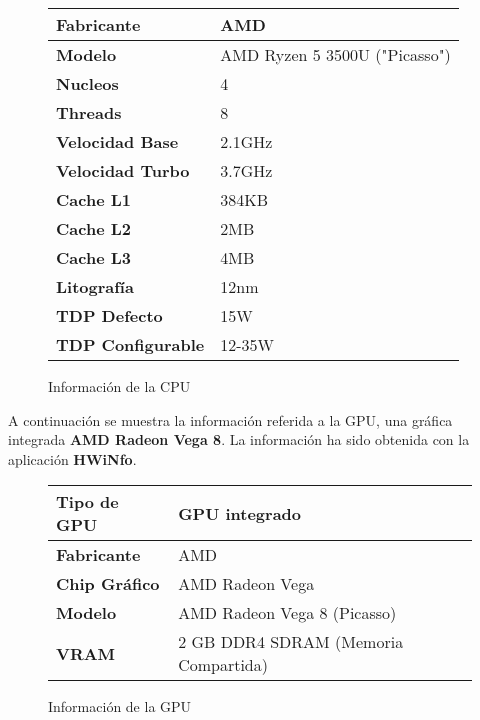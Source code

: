 \begin{figure}[ht]
    \centering

    \setlength{\tabcolsep}{10pt}
    \renewcommand{\arraystretch}{1.5}

    \begin{tabular}{| p{10em} | p{15em} |}
        \hline
        \textbf{Fabricante}       &  AMD \\ \hline
        \textbf{Modelo}           &  AMD Ryzen 5 3500U ("Picasso") \\ \hline
        \textbf{Nucleos}          &  4 \\ \hline
        \textbf{Threads}          & 8 \\ \hline
        \textbf{Velocidad Base}   &  2.1GHz \\  \hline
        \textbf{Velocidad Turbo}  &  3.7GHz  \\ \hline
        \textbf{Cache L1}  		  & 384KB  \\ \hline
        \textbf{Cache L2} 	      & 2MB  \\ \hline
        \textbf{Cache L3}  	      & 4MB  \\ \hline
        \textbf{Litografía}	      & 12nm   \\  \hline
        \textbf{TDP Defecto}      & 15W \\ \hline
        \textbf{TDP Configurable} & 12-35W \\
        \hline
    \end{tabular}
    \caption{Información de la CPU}
\end{figure}

A continuación se muestra la información referida a la GPU, una gráfica integrada \textbf{AMD Radeon Vega 8}. La información ha sido obtenida con la aplicación \textbf{HWiNfo}.

\begin{figure}[ht]

    \vspace{3ex}
    \centering

    \setlength{\tabcolsep}{10pt}
    \renewcommand{\arraystretch}{1.5}

    \begin{tabular}{| p{10em} | p{20em} |}
        \hline
        \textbf{Tipo de GPU}  &  GPU integrado \\ \hline
        \textbf{Fabricante}   &  AMD \\ \hline
        \textbf{Chip Gráfico} &  AMD Radeon Vega\\ \hline
        \textbf{Modelo}       &  AMD Radeon Vega 8 (Picasso) \\ \hline
        \textbf{VRAM}         &  2 GB DDR4 SDRAM (Memoria Compartida) \\
        \hline
    \end{tabular}
    \caption{Información de la GPU}
\end{figure}

